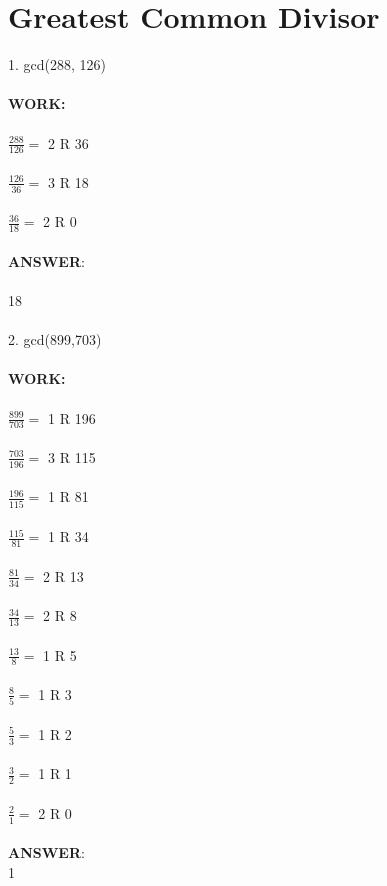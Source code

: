 \documentclass[11pt]{article}
\begin{document}
\section{Greatest Common Divisor}
1. gcd(288, 126)\\\\
\textbf{WORK:} \\\\
$\frac{288}{126} = $
2 R 36\\\\
$\frac{126}{36} = $
3 R 18 \\\\
$\frac{36}{18} = $
2 R 0\\\\
\textbf{ANSWER}: \\\\
18\\\\
2. gcd(899,703)\\\\
\textbf{WORK:}\\\\
$\frac{899}{703} = $
1 R 196\\\\
$\frac{703}{196} = $
3 R 115 \\\\
$\frac{196}{115} = $
1 R 81 \\\\
$\frac{115}{81} = $
1 R 34\\\\
$\frac{81}{34} = $
2 R 13 \\\\
$\frac{34}{13} = $
2 R 8 \\\\
$\frac{13}{8} = $
1 R 5 \\\\
$\frac{8}{5} = $
1 R 3 \\\\
$\frac{5}{3} = $
1 R 2\\\\
$\frac{3}{2} = $
1 R 1\\\\
$\frac{2}{1} = $
2 R 0\\\\
\textbf{ANSWER}: \\
1
\end{document}
